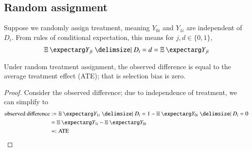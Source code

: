         \subsection{Random assignment}
            Suppose we randomly assign treatment, meaning $Y_{0i}$ and $Y_{1i}$ are independent of $D_i$. From rules of conditional expectation, this means for $j,d\in\{0,1\}$,
            \begin{align}
                \expect{Y_{ji} | D_i = d} = \expect{Y_{ji}}
            \end{align}

            \begin{theorem}
                Under random treatment assignment, the observed difference is equal to the average treatment effect (ATE); that is selection bias is zero.
            \end{theorem}
            \begin{proof}
                Consider the observed difference; due to independence of treatment, we can simplify to
                \begin{align*}
                    \text{observed difference}
                        &:= \expect{Y_{1i}|D_i=1} - \expect{Y_{0i}|D_i=0}   \\
                        &= \expect{Y_{1i}} - \expect{Y_{0i}}    \\
                        &=: \mathrm{ATE}
                \end{align*}
            \end{proof}
            
